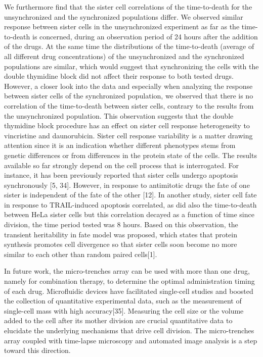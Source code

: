 \documentclass[pdftex,12pt,a4paper]{report}
\begin{document}
We furthermore find that the sister cell correlations of the time-to-death for the unsynchronized and the synchronized populations differ. We observed similar response between sister cells in the unsynchronized experiment as far as the time-to-death is concerned, during an observation period of 24 hours after the addition of the drugs. At the same time the distributions of the time-to-death (average of all different drug concentrations) of the unsynchronized and the synchronized populations are similar, which would suggest that synchronizing the cells with the double thymidine block did not affect their response to both tested drugs. However, a closer look into the data and especially when analyzing the response between sister cells of the synchronized population, we observed that there is no correlation of the time-to-death between sister cells, contrary to the results from the unsynchronized population. This observation suggests that the double thymidine block procedure has an effect on sister cell response heterogeneity to vincristine and daunorubicin. Sister cell response variability is a matter drawing attention since it is an indication whether different phenotypes stems from genetic differences or from differences in the protein state of the cells. The results available so far strongly depend on the cell process that is interrogated. For instance, it has been previously reported that sister cells undergo apoptosis synchronously [5, 34]. However, in response to antimitotic drugs the fate of one sister is independent of the fate of the other [12]. In another study, sister cell fate in response to TRAIL-induced apoptosis correlated, as did also the time-to-death between HeLa sister cells but this correlation decayed as a function of time since division, the time period tested was 8 hours. Based on this observation, the transient heritability in fate model was proposed, which states that protein synthesis promotes cell divergence so that sister cells soon become no more similar to each other than random paired cells[1].

In future work, the micro-trenches array can be used with more than one drug, namely for combination therapy, to determine the optimal administration timing of each drug. Microfluidic devices have facilitated single-cell studies and boosted the collection of quantitative experimental data, such as the measurement of single-cell mass with high accuracy[35]. Measuring the cell size or the volume added to the cell after its mother division are crucial quantitative data to elucidate the underlying mechanisms that drive cell division. The micro-trenches array coupled with time-lapse microscopy and automated image analysis is a step toward this direction.
\end{document}
